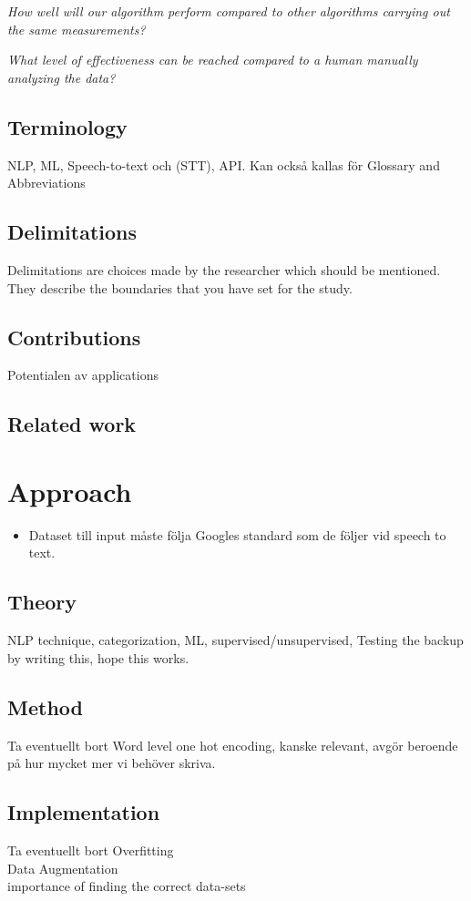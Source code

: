 \documentclass[nofilelist]{cslthse-msc}
\begin{document}
\textit{How well will our algorithm perform compared to other algorithms carrying out the same measurements?}

\textit{What level of effectiveness can be reached compared to a human manually analyzing the data?} 
\section{Terminology}
NLP, ML, Speech-to-text och (STT), API. Kan också kallas för Glossary and Abbreviations
\section{Delimitations}
Delimitations are choices made by the researcher which should be mentioned. They describe the boundaries that you have set for the study.
\section{Contributions}
Potentialen av applications 
\section{Related work}


\chapter{Approach}

\begin{itemize}
    \item Dataset till input måste följa Googles standard som de följer vid speech to text. 
\end{itemize}

\section{Theory}
NLP technique, categorization, ML, supervised/unsupervised,  
Testing the backup by writing this, hope this works.
\section{Method} Ta eventuellt bort
Word level one hot encoding, kanske relevant, avgör beroende på hur mycket mer vi behöver skriva.
\section{Implementation} Ta eventuellt bort
Overfitting \\
Data Augmentation \\
importance of finding the correct data-sets \\
\end{document}
